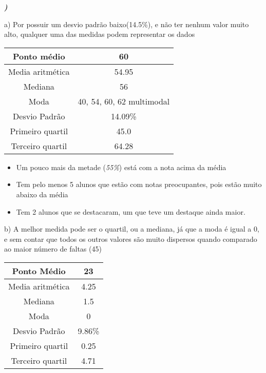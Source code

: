 \documentclass[12pt]{article}
\newcounter{instn}
\newcommand{\instnum}{\arabic{instn}}
\newcommand{\myline}[1]{
    \emph{\textbf{#1)}}
    \addtocounter{instn}{1}
}
\begin{document}
    \myline{\instnum}

    a) Por possuir um desvio padrão baixo(14.5\%), e não ter nenhum valor muito alto,
    qualquer uma das medidas podem representar os dados

    \begin{center}
        \begin{tabular}{|c | c |} 
        \hline
        Ponto médio & 60 \\ 
        \hline
        Media aritmética & 54.95 \\ 
        \hline
        Mediana & 56 \\ 
        \hline
        Moda & 40, 54, 60, 62 multimodal \\ 
        \hline
        Desvio Padrão & 14.09\% \\ 
        \hline
        Primeiro quartil & 45.0 \\ 
        \hline
        Terceiro quartil & 64.28 \\ 
        \hline
       \end{tabular}
    \end{center}

    \begin{itemize}
        \item Um pouco mais da metade (\emph{55\%}) está com a nota acima da média 
        \item Tem pelo menos 5 alunos que estão com notas preocupantes, pois estão muito abaixo da média 
        \item Tem 2 alunos que se destacaram, um que teve um destaque ainda maior.
    \end{itemize}

    \newpage

    b) A melhor medida pode ser o quartil, ou a mediana, já que a moda é igual a 0,
    e sem contar que todos os outros valores são muito dispersos quando comparado ao maior número de faltas (45)

    \begin{center}
        \begin{tabular}{|c | c |} 
        \hline
        Ponto Médio & 23 \\ 
        \hline
        Media aritmética & 4.25 \\ 
        \hline
        Mediana & 1.5 \\ 
        \hline
        Moda & 0 \\ 
        \hline
        Desvio Padrão & 9.86\% \\ 
        \hline
        Primeiro quartil & 0.25 \\ 
        \hline
        Terceiro quartil & 4.71 \\ 
        \hline
       \end{tabular}
    \end{center}
\end{document}
